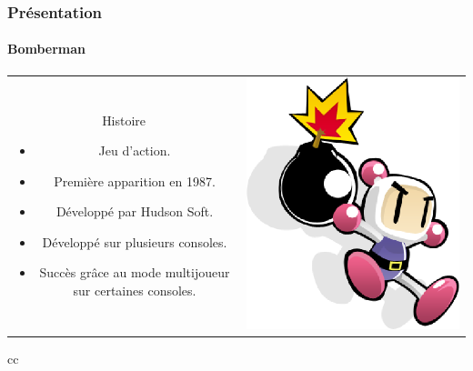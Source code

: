 \begin{frame}
\frametitle{Présentation}
\framesubtitle{Bomberman}
\begin{tabular}{cc}

\begin{minipage}{7cm}
Histoire
	\begin{itemize}
		\item Jeu d'action.
		\item Première apparition en 1987.
		\item Développé par Hudson Soft.
		\item Développé sur plusieurs consoles.
		\item Succès grâce au mode multijoueur sur certaines consoles.
	\end{itemize}
\end{minipage} 
&
\begin{minipage}{4cm}
\includegraphics[scale=0.3]{img/bomberman1.png} 
\end{minipage} 

\end{tabular}{cc}

\end{frame}


 


